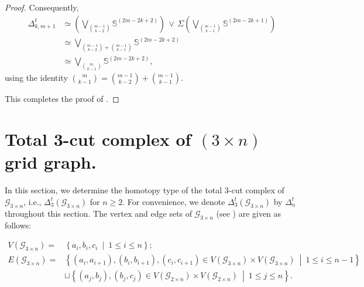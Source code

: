 \documentclass[11pt,reqno,a4paper]{amsart}
\theoremstyle{definition}
\theoremstyle{theorem}
\newcommand{\totalthreecut}{\Delta_{3}^t}
\newcommand{\twogg}{\mathcal{G}_{2\times n}}
\newcommand{\threegg}{\mathcal{G}_{3\times n}}
\newcommand{\lno}{\left(}
\newcommand{\rno}{\right)}
\newcommand{\lcu}{\left\{}
\newcommand{\rcu}{\right\}}
\newcommand{\bbS}{\mathbb{S}}
\theoremstyle{remark}
\begin{document}
\begin{proof}
\noindent Consequently,
\begin{align*}
    \Delta_{k,m+1}^t 
        &\simeq 
            \left( \bigvee_{\binom{m-1}{k-2}} 
                    \bbS^{\lno 2m - 2k + 2 \rno} \right)
            \,\vee\,
            \Sigma\!\left( 
                \bigvee_{\binom{m-1}{k-1}} 
                \bbS^{\lno 2m - 2k + 1 \rno}
            \right)\\[4pt]
        &\simeq 
            \bigvee_{\binom{m-1}{k-2} + \binom{m-1}{k-1}} 
            \bbS^{\lno 2m - 2k + 2 \rno}\\[4pt]
        &\simeq 
            \bigvee_{\binom{m}{k-1}} 
            \bbS^{\lno 2m - 2k + 2 \rno},
\end{align*}
using the identity 
$\binom{m}{k-1} = \binom{m-1}{k-2} + \binom{m-1}{k-1}$. 

This completes the proof of 
.
\end{proof}


\section{Total 3-cut complex of $\left( 3 \times n \right) $ grid graph.}\label{section:total cut 3*k}

In this section, we determine the homotopy type of the total $3$-cut complex of $\threegg$, i.e., $\totalthreecut \lno \threegg \rno$ for $n \ge 2$. 
For convenience, we denote $\totalthreecut\lno \threegg \rno$ by $\Delta_n^t$ throughout this section.
The vertex and edge sets of $\threegg$ (see ) are given as follows:

\begin{align*}
    V\lno \threegg\rno = &\lcu a_i, b_i, c_i\ \middle|\ 1\leq i \leq n\rcu;\\
    E\lno \threegg\rno = &\lcu \lno a_i, a_{i+1}\rno, \lno b_i, b_{i+1}\rno, \lno c_i, c_{i+1}\rno\in V\lno \threegg\rno\times V\lno \threegg\rno\ \middle|\ 1\leq i \leq n-1\rcu\\& \sqcup \lcu \lno a_j, b_{j}\rno, \lno b_j, c_j\rno \in V\lno \twogg\rno\times V\lno \twogg\rno\ \middle|\ 1\leq j \leq n\rcu.
\end{align*}
\end{document}
